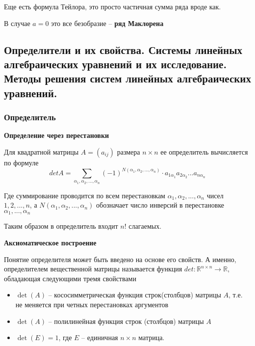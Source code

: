 \documentclass{article}
\begin{document}
	Еще есть формула Тейлора, это просто частичная сумма ряда вроде как.
	
	В случае $a = 0$ это все безобразие -- {\bf ряд Маклорена}
	
	
	\subsection{Определители и их свойства. Системы линейных алгебраических уравнений и их исследование. Методы решения систем линейных алгебраических уравнений.}
	
	\subsubsection{Определитель}
	
	
	{\bf Определение через перестановки}
	
	Для квадратной матрицы $A = (a_{ij})$ размера $n \times n$ ее определитель вычисляется по формуле $$det A = \sum\limits_{\alpha_1, \alpha_2, ..., \alpha_n}(-1)^{N(\alpha_1, \alpha_2, ..., \alpha_n)} \cdot a_{1 \alpha_1} a_{2 \alpha_2} ... a_{n \alpha_n}$$
	
	Где суммирование проводится по всем перестановкам $\alpha_1, \alpha_2, ..., \alpha_n$ чисел $1, 2, ..., n$, а $N(\alpha_1, \alpha_2, ..., \alpha_n)$ обозначает число инверсий в перестановке $\alpha_1, ..., \alpha_n$
	
	Таким образом в определитель входит $n!$ слагаемых.
	
	
	{\bf Аксиоматическое построение}
	
	Понятие определителя может быть введено на основе его свойств. А именно, определителем вещественной матрицы называется функция $det: \mathbb{R}^{n \times n} \rightarrow \mathbb{R}$, обладающая следующими тремя свойствами
	
	\begin{itemize}
		\item $\det(A)$ -- кососимметрическая функция строк(столбцов) матрицы $A$, т.е. не меняется при четных перестановках аргументов
		\item $\det(A)$ -- полилинейная функция строк (столбцов) матрицы $A$
		\item $\det(E) = 1$, где $E$ -- единичная $n \times n$ матрица.
	\end{itemize}
	
\end{document}
